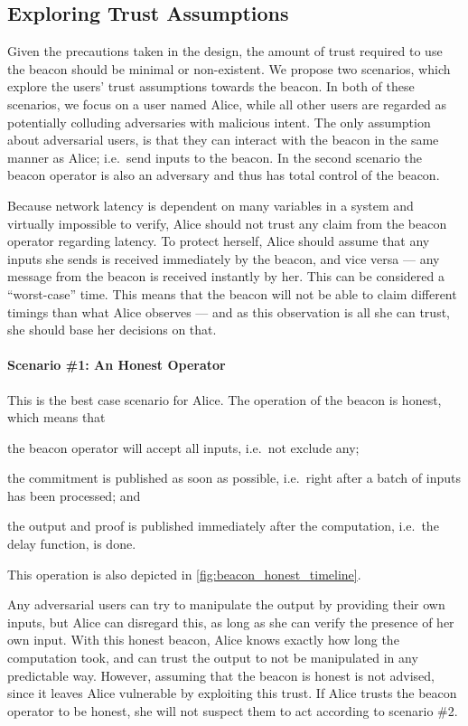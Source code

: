 \subsection{Exploring Trust Assumptions}%
\label{sub:trusting_the_beacon}
Given the precautions taken in the design, the amount of trust required to use the beacon should be minimal or non-existent.
We propose two scenarios, which explore the users' trust assumptions towards the beacon.
In both of these scenarios, we focus on a user named Alice, while all other users are regarded as potentially colluding adversaries with malicious intent.
The only assumption about adversarial users, is that they can interact with the beacon in the same manner as Alice; i.e.\ send inputs to the beacon.
In the second scenario the beacon operator is also an adversary and thus has total control of the beacon.

Because network latency is dependent on many variables in a system and virtually impossible to verify, Alice should not trust any claim from the beacon operator regarding latency.
To protect herself, Alice should assume that any inputs she sends is received immediately by the beacon, and vice versa --- any message from the beacon is received instantly by her.
This can be considered a \enquote{worst-case} time.
This means that the beacon will not be able to claim different timings than what Alice observes --- and as this observation is all she can trust, she should base her decisions on that.

\paragraph{Scenario \#1: An Honest Operator}
This is the best case scenario for Alice.
The operation of the beacon is honest, which means that
\begin{eletterate*}
\item the beacon operator will accept all inputs, i.e.\ not exclude any;
\item the commitment is published as soon as possible, i.e.\ right after a batch of inputs has been processed; and
\item the output and proof is published immediately after the computation, i.e.\ the delay function, is done.
\end{eletterate*}
This operation is also depicted in \cref{fig:beacon_honest_timeline}.

Any adversarial users can try to manipulate the output by providing their own inputs, but Alice can disregard this, as long as she can verify the presence of her own input.
With this honest beacon, Alice knows exactly how long the computation took, and can trust the output to not be manipulated in any predictable way.
However, assuming that the beacon is honest is not advised, since it leaves Alice vulnerable by exploiting this trust.
If Alice trusts the beacon operator to be honest, she will not suspect them to act according to scenario \#2.

